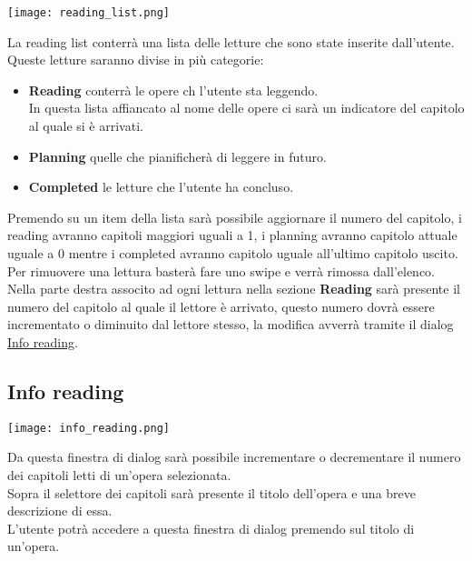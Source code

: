 \documentclass[../Assignment-3-LPSMT.tex]{subfiles}
\begin{document}
\begin{center}
   \texttt{[image: reading\_list.png]}
\end{center}

La reading list conterrà una lista delle letture che sono state inserite dall'utente.\\
Queste letture saranno divise in più categorie:
\begin{itemize}
   \item \textbf{Reading} conterrà le opere ch l'utente sta leggendo.\\
   In questa lista affiancato al nome delle opere ci sarà un indicatore del capitolo al quale si è arrivati.
   \item \textbf{Planning} quelle che pianificherà di leggere in futuro.
   \item \textbf{Completed} le letture che l'utente ha concluso.
\end{itemize}
Premendo su un item della lista sarà possibile aggiornare il numero del capitolo, i reading avranno capitoli maggiori uguali a 1, i planning avranno capitolo attuale uguale a 0 mentre i completed avranno capitolo uguale all'ultimo capitolo uscito.\\
Per rimuovere una lettura basterà fare uno swipe e verrà rimossa dall'elenco.\\
Nella parte destra associto ad ogni lettura nella sezione \textbf{Reading} sarà presente il numero del capitolo al quale il lettore è arrivato, questo numero dovrà essere incrementato o diminuito dal lettore stesso, la modifica avverrà tramite il dialog \hyperref[sec:info_reading]{Info reading}.

\subsection{Info reading}\label{sec:info_reading}

\begin{center}
   \texttt{[image: info\_reading.png]}
\end{center}

Da questa finestra di dialog sarà possibile incrementare o decrementare il numero dei capitoli letti di un'opera selezionata.\\
Sopra il selettore dei capitoli sarà presente il titolo dell'opera e una breve descrizione di essa.\\
L'utente potrà accedere a questa finestra di dialog premendo sul titolo di un'opera.\\
\end{document}
